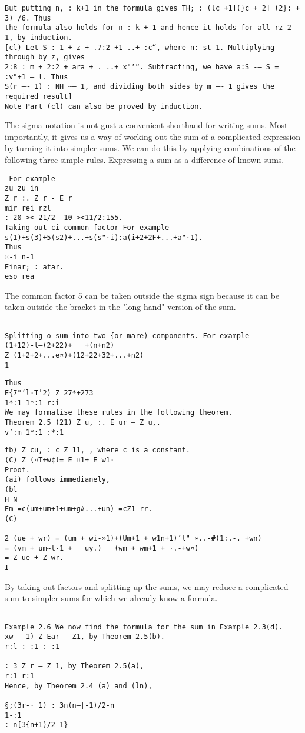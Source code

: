 \documentclass[]{article}
\begin{document}
\begin{verbatim}
But putting n, : k+1 in the formula gives TH; : (lc +1](}c + 2] (2}: + 3) /6. Thus
the formula also holds for n : k + 1 and hence it holds for all rz 2 1, by induction.
[cl) Let S : 1-+ z + .7:2 +1 ..+ :c“, where n: st 1. Multiplying through by z, gives
2:8 : m + 2:2 + ara + . ..+ x"‘“. Subtracting, we have a:S -— S = :v"+1 — l. Thus
S(r —~ 1) : NH ~— 1, and dividing both sides by m —~ 1 gives the required result]
Note Part (cl) can also be proved by induction.

\end{verbatim}
The sigma notation is not gust a convenient shorthand for writing sums. Most
importantly, it gives us a way of working out the sum of a complicated expression
by turning it into simpler sums. We can do this by applying combinations of the
following three simple rules.
Expressing a sum as a difference of known sums.
\begin{verbatim}
 For example
zu zu in
Z r :. Z r - E r
mir rei rzl
: 20 >< 21/2- 10 ><11/2:155.
Taking out ci common factor For example
s(1)+s(3)+5(s2)+...+s(s"·i):a(i+2+2F+...+a"·1).
Thus
¤-i n-1
Einar; : afar.
eso rea
\end{verbatim}
The common factor 5 can be taken outside the sigma sign because it can be taken
outside the bracket in the "long hand" version of the sum.
\begin{verbatim}

Splitting o sum into two {or mare) components. For example
(1+12)-l—(2+22)+   +(n+n2)
Z (1+2+2+...e¤)+(12+22+32+...+n2)
1

\end{verbatim}

\begin{verbatim}
Thus
E{7"‘l·T’2) Z 27*+273
1*:1 1*:1 r:i
We may formalise these rules in the following theorem.
Theorem 2.5 (21) Z u, :. E ur — Z u,.
v’:m 1*:1 :*:1
\end{verbatim}
\begin{verbatim}  
fb) Z cu, : c Z 11, , where c is a constant.
(C) Z (¤T+w¢l= E ¤1+ E w1·
Proof.
(ai) follows immedianely,
(bl
H N
Em =c(um+um+1+um+g#...+un) =cZ1-rr.
(C)
 
2 (ue + wr) = (um + wi-»1)+(Um+1 + w1n+1)’l" »..-#(1:.-. +wn)
= (vm + um~l·1 +   uy.)   (wm + wm+1 + ·.-+w¤)
= Z ue + Z wr.
I
\end{verbatim}
By taking out factors and splitting up the sums, we may reduce a complicated
sum to simpler sums for which we already know a formula.
\begin{verbatim}

Example 2.6 We now find the formula for the sum in Example 2.3(d).
xw - 1) Z Ear - Z1, by Theorem 2.5(b).
r:l :-:1 :-:1
   
: 3 Z r — Z 1, by Theorem 2.5(a),
r:1 r:1
Hence, by Theorem 2.4 (a) and (ln),
 
§;(3r-· 1) : 3n(n—|-1)/2-n
1-:1
: n[3{n+1)/2-1}
\end{verbatim}
\end{document}
